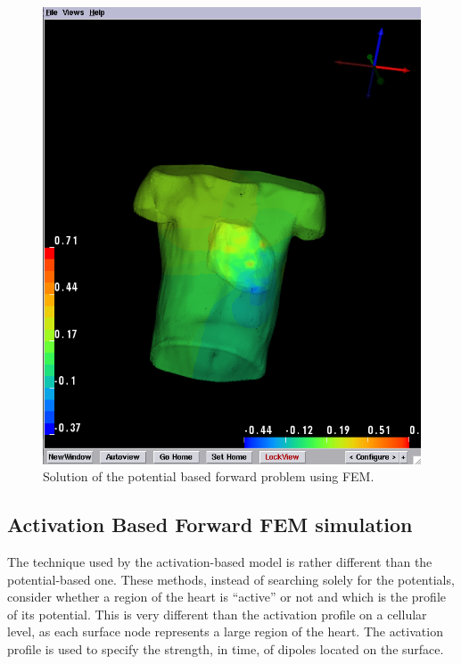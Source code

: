 \documentclass[fleqn,11pt,openany]{book}
\begin{document}
\begin{figure}[H]
\begin{center}
\includegraphics[width=\textwidth]{ECGToolkitGuide_figures/pot_fem_forward_output.png}
\caption{Solution of the potential based forward problem using FEM.}
\label{fig:pot_fem_for_sol}
\end{center}
\end{figure}



\subsection{Activation Based Forward FEM simulation}

The technique used by the activation-based model is rather different than
the potential-based one. These methods, instead of searching solely for the
potentials, consider whether a region of the heart is ``active'' or not and
which is the profile of its potential. This is very different than the activation
profile on a cellular level, as each surface node represents a large region of the
heart. The activation profile is used to specify the strength, in time, of
dipoles located on the surface.
\end{document}
